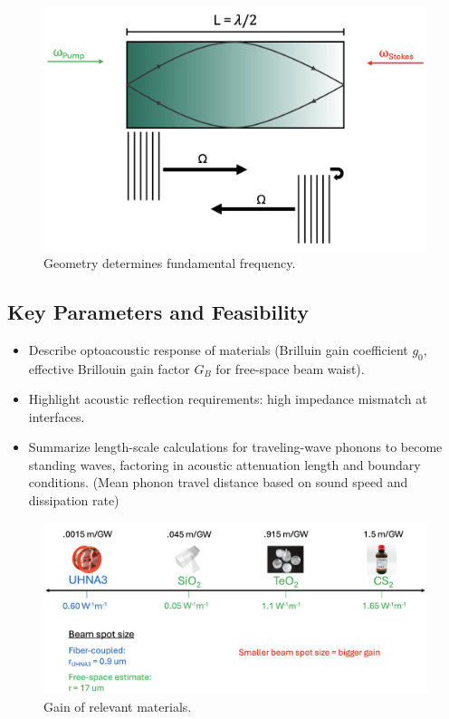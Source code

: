\begin{figure}[t]
  \centering
  \includegraphics[width=.85\textwidth]{figs/4-Raman/GeometryDeterminesFundamentalFreq.png}
  \caption{Geometry determines fundamental frequency.}
  \label{fig:Raman:GeometryDeterminesFundamentalFreq}
\end{figure}

\subsection{Key Parameters and Feasibility}
\label{subsec:Raman:KeyParametersandFeasibility}

\begin{itemize}
  \item Describe optoacoustic response of materials (Brilluin gain coefficient \(g_{0}\), effective Brillouin gain factor \(G_{B}\) for free-space beam waist).
  \item Highlight acoustic reflection requirements: high impedance mismatch at interfaces.
  \item Summarize length-scale calculations for traveling-wave phonons to become standing waves, factoring in acoustic attenuation length and boundary conditions. (Mean phonon travel distance based on sound speed and dissipation rate)
\end{itemize}

\begin{figure}[t]
  \centering
  \includegraphics[width=\textwidth]{figs/4-Raman/GainOfRelevantMaterials.png}
  \caption{Gain of relevant materials.}
  \label{fig:Raman:GainOfRelevantMaterials}
\end{figure}

